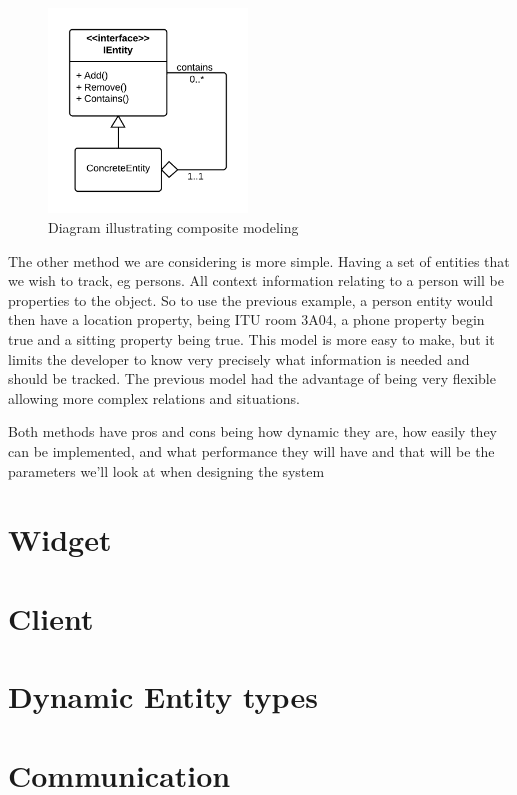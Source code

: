 \documentclass[]{report}
\begin{document}
\begin{figure}[H]
\centering
\includegraphics[width=200px]{composite.png}
\caption{Diagram illustrating composite modeling}
\label{fig:composite}
\end{figure}


The other method we are considering is more simple. Having a set of entities that we wish to track, eg persons. All context information relating to a person will be properties to the object. So to use the previous example, a person entity would then have a location property, being ITU room 3A04, a phone property begin true and a sitting property being true. This model is more easy to make, but it limits the developer to know very precisely what information is needed and should be tracked. The previous model had the advantage of being very flexible allowing more complex relations and situations. 

Both methods have pros and cons being how dynamic they are, how easily they can be implemented, and what performance they will have and that will be the parameters we'll look at when designing the system 

\section{Widget}

\section{Client}


\section{Dynamic Entity types}


\section{Communication}
\end{document}
